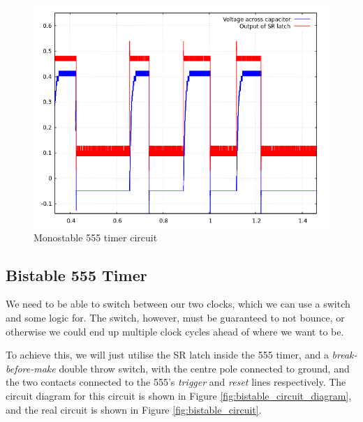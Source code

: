 \documentclass[12pt]{article}
\begin{document}
\begin{FlushLeft}
\begin{figure}[hb]
  \begin{center}
    \includegraphics[width=0.9\linewidth]{../modules/clock/monostable_scope.png}
    \caption{Monostable 555 timer circuit}
    \label{fig:monostable_scope}
  \end{center}
\end{figure}

\clearpage


\subsection{Bistable 555 Timer}
We need to be able to switch between our two clocks, which we can use a switch and some logic for. The switch, however, must be guaranteed to not bounce, or otherwise we could end up multiple clock cycles ahead of where we want to be. \\

\vspace{0.3cm}

To achieve this, we will just utilise the SR latch inside the 555 timer, and a \textit{break-before-make} double throw switch, with the centre pole connected to ground, and the two contacts connected to the 555's \textit{trigger} and \textit{reset} lines respectively. The circuit diagram for this circuit is shown in Figure \ref{fig:bistable_circuit_diagram}, and the real circuit is shown in Figure \ref{fig:bistable_circuit}. \\


\end{FlushLeft}
\end{document}
